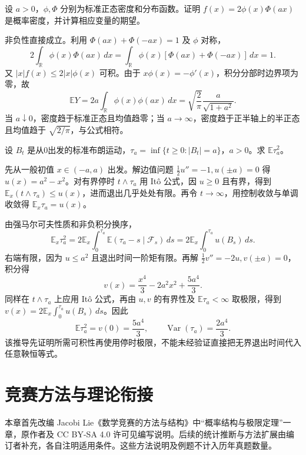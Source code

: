 \documentclass[UTF8,12pt,a4paper,fontset=fandol]{ctexbook}
\newcommand{\E}{\mathbb E}
\DeclareMathOperator{\Var}{Var}
\begin{document}
\begin{example}[原题3：偏斜正态密度与均值]\label{yau:2026-3}
设 $a>0$，$\phi,\Phi$ 分别为标准正态密度和分布函数。证明 $f(x)=2\phi(x)\Phi(ax)$ 是概率密度，并计算相应变量的期望。
\end{example}
\begin{solve}
非负性直接成立。利用 $\Phi(ax)+\Phi(-ax)=1$ 及 $\phi$ 对称，
\[
2\int_{\mathbb R}\phi(x)\Phi(ax)\,dx=\int_{\mathbb R}\phi(x)[\Phi(ax)+\Phi(-ax)]\,dx=1.
\]
又 $|x|f(x)\le2|x|\phi(x)$ 可积。由于 $x\phi(x)=-\phi'(x)$，积分分部时边界项为零，故
\[
\E Y=2a\int_{\mathbb R}\phi(x)\phi(ax)\,dx
=\sqrt{\frac2\pi}\frac a{\sqrt{1+a^2}}.
\]
当 $a\downarrow0$，密度趋于标准正态且均值趋零；当 $a\to\infty$，密度趋于正半轴上的半正态且均值趋于 $\sqrt{2/\pi}$，与公式相符。
\end{solve}

\begin{example}[原题4：布朗运动对称区间退出时间的二阶矩]\label{yau:2026-4}
设 $B_t$ 是从0出发的标准布朗运动，$\tau_a=\inf\{t\ge0:|B_t|=a\}$，$a>0$。求 $\E\tau_a^2$。
\end{example}
\begin{solve}
先从一般初值 $x\in(-a,a)$ 出发。解边值问题 $\tfrac12u''=-1,u(\pm a)=0$ 得 $u(x)=a^2-x^2$。对有界停时 $t\wedge\tau_a$ 用 Itô 公式，因 $u\ge0$ 且有界，得到 $\E_x(t\wedge\tau_a)\le u(x)$，进而退出几乎处处有限。再令 $t\to\infty$，用控制收敛与单调收敛得 $\E_x\tau_a=u(x)$。

由强马尔可夫性质和非负积分换序，
\[
\E_x\tau_a^2=2\E_x\int_0^{\tau_a}\E(\tau_a-s\mid\mathcal F_s)\,ds
=2\E_x\int_0^{\tau_a}u(B_s)\,ds.
\]
右端有限，因为 $u\le a^2$ 且退出时间一阶矩有限。再解 $\tfrac12v''=-2u,v(\pm a)=0$，积分得
\[
v(x)=\frac{x^4}{3}-2a^2x^2+\frac{5a^4}{3}.
\]
同样在 $t\wedge\tau_a$ 上应用 Itô 公式，再由 $u,v$ 的有界性及 $\E\tau_a<\infty$ 取极限，得到 $v(x)=2\E_x\int_0^{\tau_a}u(B_s)\,ds$。因此
\[
\E\tau_a^2=v(0)=\frac{5a^4}{3},\qquad \Var(\tau_a)=\frac{2a^4}{3}.
\]
该推导先证明所需可积性再使用停时极限，不能未经验证直接把无界退出时间代入任意鞅恒等式。
\end{solve}


\chapter{竞赛方法与理论衔接}
本章首先改编 Jacobi Lie《数学竞赛的方法与结构》中“概率结构与极限定理”一章，原作者及 CC BY-SA 4.0 许可见编写说明。后续的统计推断与方法扩展由编订者补充，各自注明适用条件。这些方法说明及例题不计入历年真题数量。
\end{document}
